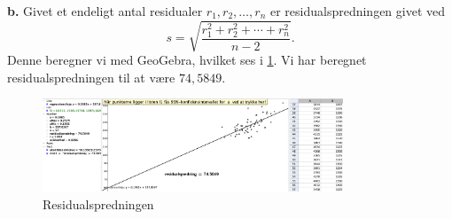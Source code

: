 \documentclass{article}
\begin{document}
\noindent \textbf{b.}
Givet et endeligt antal residualer $r_1, r_2, \ldots, r_n$ er residualspredningen givet ved
\[
s=\sqrt{\frac{r_1^2 + r_2^2 + \cdots + r_n^2}{n-2}}.
\] 
Denne beregner vi med GeoGebra, hvilket ses i \cref{fig:residualspredning}.
Vi har beregnet residualspredningen til at være $74,5849$.
\begin{figure}[H]
\begin{center}
  \includegraphics[width=0.8\textwidth]{residualspredning.png}
\end{center}
\caption{Residualspredningen}
\label{fig:residualspredning}
\end{figure}
\end{document}
